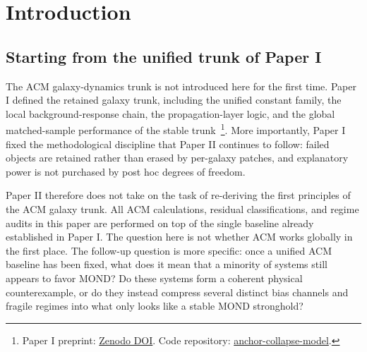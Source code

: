 ﻿\documentclass[aps,prd,twocolumn,superscriptaddress,longbibliography,nofootinbib,floatfix,10pt]{revtex4-2}
\begin{document}
\maketitle

\begin{center}
\end{center}

\section{Introduction}

\subsection{Starting from the unified trunk of Paper I}

The ACM galaxy-dynamics trunk is not introduced here for the first time.
Paper I defined the retained galaxy trunk, including the unified constant
family, the local background-response chain, the propagation-layer logic, and
the global matched-sample performance of the stable trunk~\cite{Liu2026PaperI}\footnote{Paper I preprint: \href{https://doi.org/10.5281/zenodo.19163963}{Zenodo DOI}. Code repository: \href{https://github.com/lesleyliuhaitao-ctrl/anchor-collapse-model.git}{anchor-collapse-model}.}. More
importantly, Paper I fixed the methodological discipline that Paper II
continues to follow: failed objects are retained rather than erased by
per-galaxy patches, and explanatory power is not purchased by post hoc degrees
of freedom.

Paper II therefore does not take on the task of re-deriving the first
principles of the ACM galaxy trunk. All ACM calculations, residual
classifications, and regime audits in this paper are performed on top of the
single baseline already established in Paper I. The question here is not
whether ACM works globally in the first place. The follow-up question is more
specific: once a unified ACM baseline has been fixed, what does it mean that a
minority of systems still appears to favor MOND? Do these systems form a
coherent physical counterexample, or do they instead compress several distinct
bias channels and fragile regimes into what only looks like a stable MOND
stronghold?
\end{document}
